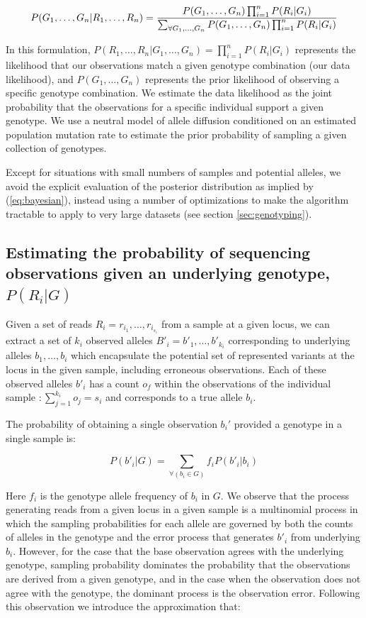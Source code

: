 \documentclass{article}
\begin{document}
\begin{equation}
\label{eq:bayesian}
P(G_1,\ldots,G_n|R_1,\ldots,R_n) = { P(G_1,\ldots,G_n) \prod_{i=1}^n P(R_i|G_i) \over 
\sum_{\forall{G_1,\ldots,G_n}}  P(G_1,\ldots,G_n) \prod_{i=1}^n P(R_i|G_i) }
\end{equation}

In this formulation, $P(R_1,\ldots,R_n|G_1,\ldots,G_n) = \prod_{i=1}^n P(R_i|G_i)$ represents the likelihood that our observations match a given genotype combination (our data likelihood), and $P(G_1,\ldots,G_n)$ represents the prior likelihood of observing a specific genotype combination.  We estimate the data likelihood as the joint probability that the observations for a specific individual support a given genotype.  We use a neutral model of allele diffusion conditioned on an estimated population mutation rate to estimate the prior probability of sampling a given collection of genotypes.

Except for situations with small numbers of samples and potential alleles, we avoid the explicit evaluation of the posterior distribution as implied by (\ref{eq:bayesian}), instead using a number of optimizations to make the algorithm tractable to apply to very large datasets (see section \ref{sec:genotyping}).


\subsection{Estimating the probability of sequencing observations given an underlying genotype, $P(R_i|G)$}

Given a set of reads $R_i = r_{i_1},\ldots,r_{i_{s_i}}$ from a sample at a given locus, we can extract a set of $k_i$ observed alleles $B'_i = b'_1,\ldots,b'_{k_i}$ corresponding to underlying alleles $b_1,\ldots,b_i$ which encapsulate the potential set of represented variants at the locus in the given sample, including erroneous observations.  Each of these observed alleles $b'_i$ has a count $o_f$ within the observations of the individual sample $: \sum_{j=1}^{k_i} o_j = s_i$ and corresponds to a true allele $b_i$.

The probability of obtaining a single observation $b_i'$ provided a genotype in a single sample is:

\begin{equation}
P(b'_i|G) = \sum_{\forall(b_i \in G)} { f_i P(b'_i|b_i) }
\end{equation}

Here $f_i$ is the genotype allele frequency of $b_i$ in $G$.  We observe that the process generating reads from a given locus in a given sample is a multinomial process in which the sampling probabilities for each allele are governed by both the counts of alleles in the genotype and the error process that generates $b'_i$ from underlying $b_i$.  However, for the case that the base observation agrees with the underlying genotype, sampling probability dominates the probability that the observations are derived from a given genotype, and in the case when the observation does not agree with the genotype, the dominant process is the observation error.  Following this observation we introduce the approximation that:
\end{document}
